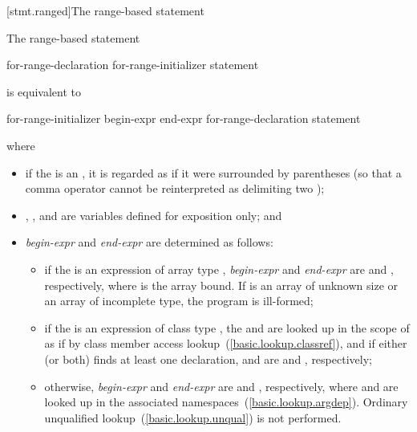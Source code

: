 [stmt.ranged]{The range-based  statement}%

\pnum
The range-based  statement

\begin{ncbnf}
 for-range-declaration \terminal{:} for-range-initializer \terminal{)} statement
\end{ncbnf}

is equivalent to

\begin{ncbnftab}
\terminal{\{}\br
\> for-range-initializer \terminal{;}\br
\> begin-expr \terminal{,}\br
\> end-expr \terminal{;}\br
\>\br
\>\br
\>\>for-range-declaration \br
\>\>statement\br
\>\terminal{\}}\br
\terminal{\}}
\end{ncbnftab}

where

\begin{itemize}
\item 
if the  is an ,
it is regarded as if it were surrounded by parentheses (so that a comma operator
cannot be reinterpreted as delimiting two );

\item {}, , and  are variables defined for
exposition only; and

\item
\textit{begin-expr} and \textit{end-expr} are determined as follows:

\begin{itemize}
\item if the  is an expression of
array type , \textit{begin-expr} and \textit{end-expr} are
 and , respectively, where  is
the array bound. If  is an array of unknown size or an array of
incomplete type, the program is ill-formed;

\item if the  is an expression of
class type , the 
 and  are looked up in the scope of 
as if by class member access lookup~(\ref{basic.lookup.classref}), and if either
(or both) finds at least one declaration,  and
 are  and ,
respectively;

\item otherwise, \textit{begin-expr} and \textit{end-expr} are 
and , respectively, where  and  are looked
up in the associated namespaces~(\ref{basic.lookup.argdep}).
\enternote Ordinary unqualified lookup~(\ref{basic.lookup.unqual}) is not
performed. \exitnote
\end{itemize}
\end{itemize}

